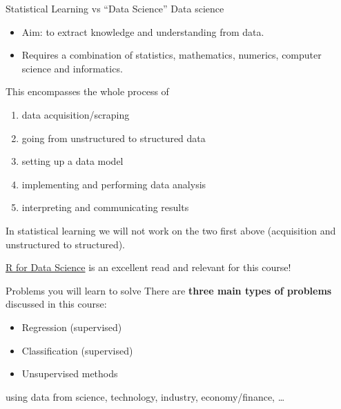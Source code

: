 \documentclass[
  10pt,
  ignorenonframetext,
]{beamer}
\providecommand{\tightlist}{%
  \setlength{\itemsep}{0pt}\setlength{\parskip}{0pt}}
\begin{document}
\begin{frame}{Statistical Learning vs ``Data Science''}
\protect\hypertarget{statistical-learning-vs-data-science}{}
Data science

\begin{itemize}
\tightlist
\item
  Aim: to extract knowledge and understanding from data.
\end{itemize}

\vspace{1mm}

\begin{itemize}
\tightlist
\item
  Requires a combination of statistics, mathematics, numerics, computer
  science and informatics.
\end{itemize}

\vspace{1mm}

This encompasses the whole process of

\begin{enumerate}
\tightlist
\item
  data acquisition/scraping
\item
  going from unstructured to structured data
\item
  setting up a data model
\item
  implementing and performing data analysis
\item
  interpreting and communicating results
\end{enumerate}

In statistical learning we will not work on the two first above
(acquisition and unstructured to structured).

\href{http://r4ds.had.co.nz/}{R for Data Science} is an excellent read
and relevant for this course!
\end{frame}

\begin{frame}{Problems you will learn to solve}
\protect\hypertarget{problems-you-will-learn-to-solve}{}
There are \textbf{three main types of problems} discussed in this
course:

\begin{itemize}
\item
  Regression (supervised)
\item
  Classification (supervised)
\item
  Unsupervised methods
\end{itemize}

using data from science, technology, industry, economy/finance, \ldots{}
\end{frame}
\end{document}
